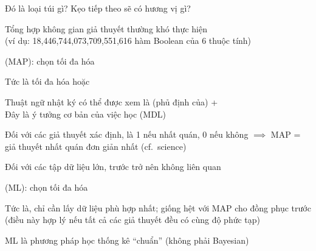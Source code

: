 \documentclass{article}
\begin{document}
\begin{huge}
Đó là loại túi gì? Kẹo tiếp theo sẽ có hương vị gì?



\vspace*{0.2in}

\textwidth
{}





\vspace*{0.2in}

\textwidth
{}



Tổng hợp không gian giả thuyết thường khó thực hiện \\
(ví dụ: 18,446,744,073,709,551,616 hàm Boolean của 6 thuộc tính)

 (MAP): chọn  tối đa hóa 

Tức là tối đa hóa  hoặc 

Thuật ngữ nhật ký có thể được xem là (phủ định của)\al
{} +  \\
Đây là ý tưởng cơ bản của việc học  (MDL)

Đối với các giả thuyết xác định,  là 1 nếu nhất quán, 0 nếu không \nl
$\implies$ MAP = giả thuyết nhất quán đơn giản nhất (cf.~science)




Đối với các tập dữ liệu lớn, trước trở nên không liên quan

 (ML): chọn  tối đa hóa 

Tức là, chỉ cần lấy dữ liệu phù hợp nhất; giống hệt với MAP cho đồng phục trước\\
(điều này hợp lý nếu tất cả các giả thuyết đều có cùng độ phức tạp)

ML là phương pháp học thống kê ``chuẩn'' (không phải Bayesian)



\end{huge}
\end{document}
